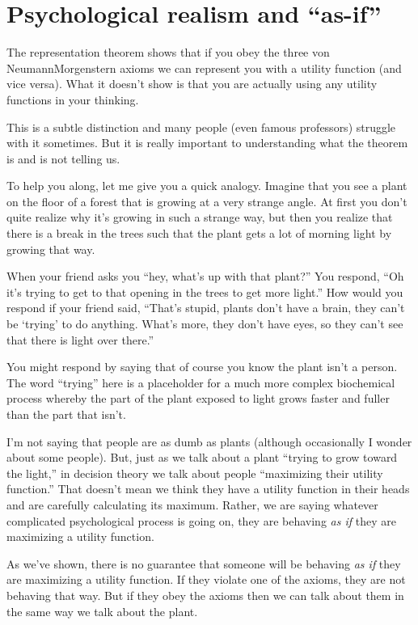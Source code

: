\section{Psychological realism and ``as-if''}

The representation theorem shows that if you obey the three von Neumann\breakslash Morgenstern axioms we can represent you with a utility function (and vice versa).  What it doesn't show is that you are actually using any utility functions in your thinking.

This is a subtle distinction and many people (even famous professors) struggle with it sometimes.  But it is really important to understanding what the theorem is and is not telling us. 

To help you along, let me give you a quick analogy.  Imagine that you see a plant on the floor of a forest that is growing at a very strange angle.  At first you don't quite realize why it's growing in such a strange way, but then you realize that there is a break in the trees such that the plant gets a lot of morning light by growing that way.  

When your friend asks you ``hey, what's up with that plant?'' You respond, ``Oh it's trying to get to that opening in the trees to get more light.''  How would you respond if your friend said, ``That's stupid, plants don't have a brain, they can't be `trying' to do anything.  What's more, they don't have eyes, so they can't see that there is light over there.''

You might respond by saying that of course you know the plant isn't a person.  The word ``trying'' here is a placeholder for a much more complex biochemical process whereby the part of the plant exposed to light grows faster and fuller than the part that isn't.

I'm not saying that people are as dumb as plants (although occasionally I wonder about some people).  But, just as we talk about a plant ``trying to grow toward the light,'' in decision theory we talk about people ``maximizing their utility function.''  That doesn't mean we think they have a utility function in their heads and are carefully calculating its maximum.  Rather, we are saying whatever complicated psychological process is going on, they are behaving {\it as if} they are maximizing a utility function.

As we've shown, there is no guarantee that someone will be behaving {\it as if} they are maximizing a utility function.  If they violate one of the axioms, they are not behaving that way.  But if they obey the axioms then we can talk about them in the same way we talk about the plant.


